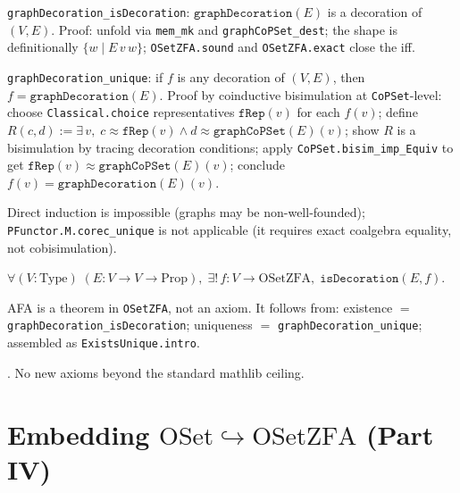 \begin{theorem}
\label{thm:graphDecoration_exists}
\leanok
{}
\texttt{graphDecoration\_isDecoration}: $\texttt{graphDecoration}(E)$ is
a decoration of $(V, E)$.  Proof: unfold via \texttt{mem\_mk} and
\texttt{graphCoPSet\_dest}; the shape is definitionally $\{w \mid E\,v\,w\}$;
\texttt{OSetZFA.sound} and \texttt{OSetZFA.exact} close the iff.

\texttt{graphDecoration\_unique}: if $f$ is any decoration of $(V, E)$,
then $f = \texttt{graphDecoration}(E)$.  Proof by coinductive bisimulation
at \texttt{CoPSet}-level: choose \texttt{Classical.choice} representatives
$\texttt{fRep}(v)$ for each $f(v)$; define $R(c, d) := \exists\, v,\;
c \approx \texttt{fRep}(v) \land d \approx \texttt{graphCoPSet}(E)(v)$; show
$R$ is a bisimulation by tracing decoration conditions; apply
\texttt{CoPSet.bisim\_imp\_Equiv} to get $\texttt{fRep}(v) \approx
\texttt{graphCoPSet}(E)(v)$; conclude $f(v) = \texttt{graphDecoration}(E)(v)$.

Direct induction is impossible (graphs may be non-well-founded);
\texttt{PFunctor.M.corec\_unique} is not applicable (it requires exact
coalgebra equality, not cobisimulation).
\end{theorem}

\begin{theorem}
\label{thm:AFA_in_OSetZFA}
\leanok
{}
$\forall (V : \mathrm{Type})\; (E : V \to V \to \mathrm{Prop}),\;
\exists!\, f : V \to \mathrm{OSetZFA},\; \texttt{isDecoration}(E, f)$.

AFA is a theorem in \texttt{OSetZFA}, not an axiom.  It follows from:
existence $=$ \texttt{graphDecoration\_isDecoration};
uniqueness $=$ \texttt{graphDecoration\_unique};
assembled as \texttt{ExistsUnique.intro}.

\noindent{}.
No new axioms beyond the standard mathlib ceiling.
\end{theorem}

\section{Embedding $\mathrm{OSet} \hookrightarrow \mathrm{OSetZFA}$ (Part IV)}
\label{sec:setszfa_embed}

